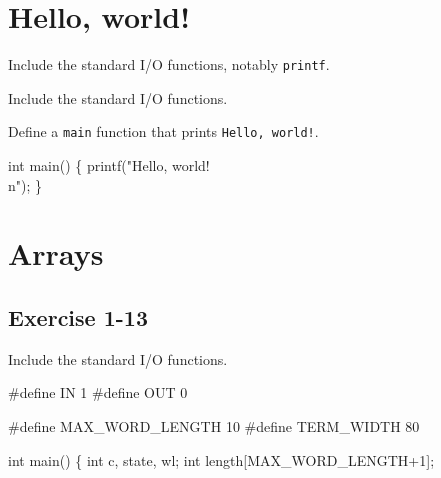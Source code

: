 \section{Hello, world!}

Include the standard I/O functions, notably {\tt{}\protect{}printf}.

\nwenddocs{}\endmoddef{}
\LA{}Include the standard I/O functions.~{\nwtagstyle{}}\RA{}
\nwendcode{}\nwdocspar


Define a {\tt{}main} function that prints {\tt{}Hello,\ world!}.

\nwenddocs{}\plusendmoddef
int main()
\{
    printf("Hello, world!\\n");
\}
\nwendcode{}\nwdocspar
\nwenddocs{}\section{Arrays}

\subsection{Exercise 1-13}


\nwenddocs{}\endmoddef{}
\LA{}Include the standard I/O functions.~{\nwtagstyle{}}\RA{}


#define IN    1
#define OUT   0

#define MAX_WORD_LENGTH 10
#define TERM_WIDTH 80


int main()
\{
    int c, state, wl;
    int length[MAX_WORD_LENGTH+1];

